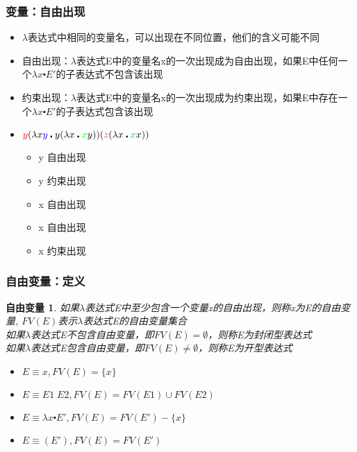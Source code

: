 \documentclass[CJKutf8,compress,hyperref]{beamer}
\begin{document}
\begin{CJK}{UTF8}{song}
\begin{frame} 
  \frametitle{变量：自由出现}  
  \begin{itemize}
  \item $\lambda$表达式中相同的变量名，可以出现在不同位置，他们的含义可能不同
  \item 自由出现：$\lambda$表达式E中的变量名x的一次出现成为自由出现，如果E中任何一个$\lambda x \centerdot E'$的子表达式不包含该出现 
  \item 约束出现：$\lambda$表达式E中的变量名x的一次出现成为约束出现，如果E中存在一个$\lambda x \centerdot E'$的子表达式包含该出现 
  \item ${\color{red}y}(\lambda x {\color{blue}y} \centerdot
    y (\lambda x \centerdot {\color{green}x}y))
    ({\color{magenta}z} (\lambda x \centerdot {\color{cyan}x}x))$ 
    \begin{itemize} 
    \item {\color{red}y} 自由出现
    \item {\color{blue}y} 约束出现 
    \item {\color{green}x} 自由出现 
    \item {\color{magenta}x} 自由出现 
    \item {\color{cyan}x} 约束出现 
    \end{itemize} 
  \end{itemize}  
\end{frame}

\begin{frame}
  \frametitle{自由变量：定义} 
  \newtheorem{fv}{自由变量} 
  \begin{fv}
    如果$\lambda$表达式E中至少包含一个变量x的自由出现，则称x为E的{\color{red}自由变量}, $FV(E)$表示$\lambda$表达式E的自由变量集合 \\ 
    如果$\lambda$表达式E不包含自由变量，即$FV(E) = \emptyset$，则称E为封闭型表达式\\ 
    如果$\lambda$表达式E包含自由变量，即$FV(E) \neq \emptyset$，则称E为开型表达式
  \end{fv} 
  \begin{itemize}
  \item  
    $E \equiv x , FV(E) = \{ x \}$
  \item       
    $E \equiv E1 \; E2,  FV(E) =  FV(E1) \cup FV(E2) $    
  \item
    $E \equiv \lambda x \centerdot E',  FV(E) =  FV(E')
    -\{ x \}     $
  \item
    $E \equiv (E'), FV(E) =  FV(E') $
  \end{itemize}
\end{frame}


\end{CJK}
\end{document}
